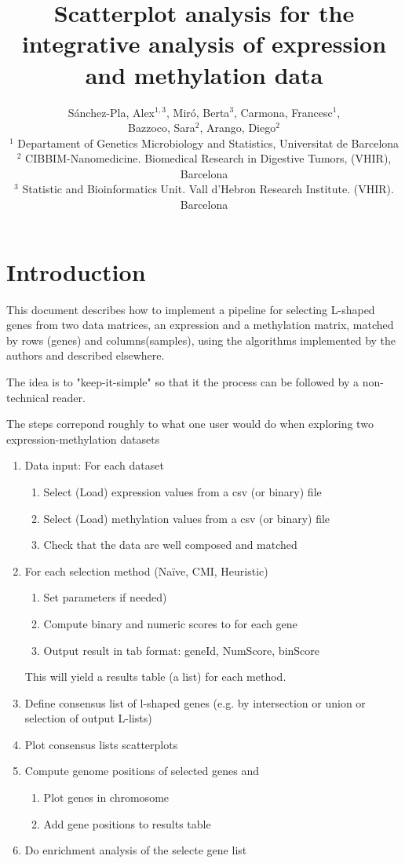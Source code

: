 \documentclass[a4paper,10pt]{article}\usepackage[]{graphicx}\usepackage[]{color}
\title{Scatterplot analysis for the integrative analysis of expression and methylation data}
\author{S\'anchez-Pla, Alex$^{1,3}$, Mir\'o, Berta$^3$, Carmona, Francesc$^1$, \\ Bazzoco, Sara$^2$, Arango, Diego$^2$\\
  $^1$ Departament of Genetics Microbiology and Statistics, Universitat de Barcelona\\
  $^2$ CIBBIM-Nanomedicine. Biomedical Research in Digestive Tumors, (VHIR), Barcelona\\
  $^3$ Statistic and Bioinformatics Unit. Vall d'Hebron Research Institute.  (VHIR). Barcelona}
\date{}
\begin{document}
\maketitle

\thispagestyle{empty}

\tableofcontents

\section{Introduction}

This document describes how to implement a pipeline for selecting L-shaped genes from two data matrices, an expression and a methylation matrix, matched by rows (genes) and columns(samples), using the algorithms implemented by the authors and described elsewhere.

The idea is to "keep-it-simple" so that it the process can be followed by a non-technical reader. 

The steps correpond roughly to what one user would do when exploring two expression-methylation datasets

\begin{enumerate}
  \item Data input: For each dataset
  \begin{enumerate} 
    \item Select (Load) expression values from a csv (or binary) file
    \item Select (Load) methylation values from a csv  (or binary) file
    \item Check that the data are well composed and matched
  \end{enumerate}
  \item For each selection method (Naïve, CMI, Heuristic)
  \begin{enumerate}
   \item Set parameters if needed)
    \item Compute binary and numeric scores to for each gene
    \item Output result in tab format: geneId, NumScore, binScore
  \end{enumerate}
  This will yield a results table (a list) for each method.
  \item Define consensus list of l-shaped genes (e.g. by intersection or union or selection of output L-lists)
  \item Plot consensus lists scatterplots
  \item Compute genome positions of selected genes and
  \begin{enumerate}
  \item Plot genes in chromosome
  \item Add gene positions to results table
  \end{enumerate}
  \item Do enrichment analysis of the selecte gene list
\end{enumerate}
\end{document}
